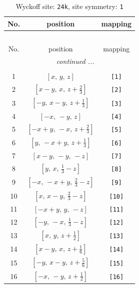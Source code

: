 \documentclass[fleqn,8pt]{jsarticle}
\begin{document}
\begin{longtable}{ccc}
\caption{Wyckoff site: {\tt 24k}, site symmetry: {\tt 1}}
 \\
 \hline \hline
No. & position & mapping \\ \hline \endfirsthead

\multicolumn{2}{l}{\tablename\ \thetable{}} \\
 \hline \hline
No. & position & mapping \\ \hline \endhead

 \hline \hline
\multicolumn{2}{r}{\footnotesize\it continued ...} \\ \endfoot

 \hline \hline
\multicolumn{2}{r}{} \\ \endlastfoot

1 & $\left[ x,\, y,\, z \right]$ & {\tt [1]} \\ \hline
2 & $\left[ x - y,\, x,\, z + \frac{2}{3} \right]$ & {\tt [2]} \\ \hline
3 & $\left[ - y,\, x - y,\, z + \frac{1}{3} \right]$ & {\tt [3]} \\ \hline
4 & $\left[ - x,\, - y,\, z \right]$ & {\tt [4]} \\ \hline
5 & $\left[ - x + y,\, - x,\, z + \frac{2}{3} \right]$ & {\tt [5]} \\ \hline
6 & $\left[ y,\, - x + y,\, z + \frac{1}{3} \right]$ & {\tt [6]} \\ \hline
7 & $\left[ x - y,\, - y,\, - z \right]$ & {\tt [7]} \\ \hline
8 & $\left[ y,\, x,\, \frac{1}{3} - z \right]$ & {\tt [8]} \\ \hline
9 & $\left[ - x,\, - x + y,\, \frac{2}{3} - z \right]$ & {\tt [9]} \\ \hline
10 & $\left[ x,\, x - y,\, \frac{2}{3} - z \right]$ & {\tt [10]} \\ \hline
11 & $\left[ - x + y,\, y,\, - z \right]$ & {\tt [11]} \\ \hline
12 & $\left[ - y,\, - x,\, \frac{1}{3} - z \right]$ & {\tt [12]} \\ \hline
13 & $\left[ x,\, y,\, z + \frac{1}{2} \right]$ & {\tt [13]} \\ \hline
14 & $\left[ x - y,\, x,\, z + \frac{1}{6} \right]$ & {\tt [14]} \\ \hline
15 & $\left[ - y,\, x - y,\, z + \frac{5}{6} \right]$ & {\tt [15]} \\ \hline
16 & $\left[ - x,\, - y,\, z + \frac{1}{2} \right]$ & {\tt [16]} \\ \hline

\end{longtable}
\end{document}
